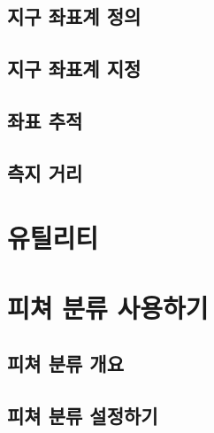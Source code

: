 \documentclass[12pt,a4paper,oneside]{book}
\begin{document}
	\newpage
	\section{지구 좌표계 정의}
	

	\newpage
	\section{지구 좌표계 지정}
	

	\newpage
	\section{좌표 추적}
	
	\newpage
	\section{측지 거리}
	



\newpage
\chapter{	유틸리티}


	

				
\newpage
\chapter{피쳐 분류 사용하기}


	\newpage
	\section{피쳐 분류 개요}
	
	
	\newpage
	\section{피쳐 분류 설정하기}
	
	
	\newpage
\end{document}
